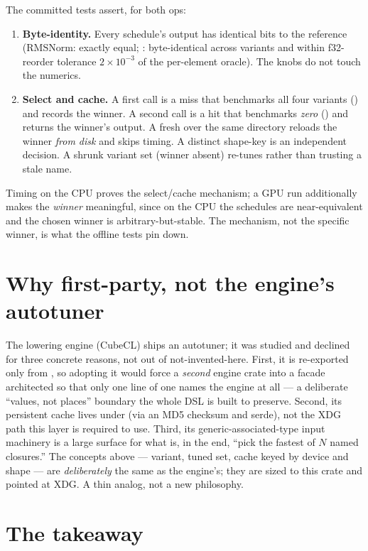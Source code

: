 \documentclass[11pt]{article}
\begin{document}
The committed tests assert, for both ops:
\begin{enumerate}[leftmargin=1.5em,itemsep=1pt]
\item \textbf{Byte-identity.} Every schedule's output has identical bits to the reference (RMSNorm:
exactly equal; \dpa{}: byte-identical across variants and within f32-reorder tolerance
$2\times10^{-3}$ of the per-element oracle). The knobs do not touch the numerics.
\item \textbf{Select and cache.} A first call is a miss that benchmarks all four variants
() and records the winner. A second call is a hit that benchmarks \emph{zero}
() and returns the winner's output. A fresh  over the same directory
reloads the winner \emph{from disk} and skips timing. A distinct shape-key is an independent decision. A
shrunk variant set (winner absent) re-tunes rather than trusting a stale name.
\end{enumerate}
Timing on the CPU proves the select/cache mechanism; a GPU run additionally makes the \emph{winner}
meaningful, since on the CPU the schedules are near-equivalent and the chosen winner is
arbitrary-but-stable. The mechanism, not the specific winner, is what the offline tests pin down.

\section{Why first-party, not the engine's autotuner}

The lowering engine (CubeCL) ships an autotuner; it was studied and declined for three concrete reasons,
not out of not-invented-here. First, it is re-exported only from , so adopting it
would force a \emph{second} engine crate into a facade architected so that only one line of one
 names the engine at all --- a deliberate ``values, not places'' boundary the whole DSL
is built to preserve. Second, its persistent cache lives under  (via an MD5 checksum and
serde), not the XDG path this layer is required to use. Third, its generic-associated-type input
machinery is a large surface for what is, in the end, ``pick the fastest of $N$ named closures.'' The
concepts above --- variant, tuned set, cache keyed by device and shape --- are \emph{deliberately} the
same as the engine's; they are sized to this crate and pointed at XDG. A thin analog, not a new
philosophy.

\section{The takeaway}
\end{document}
